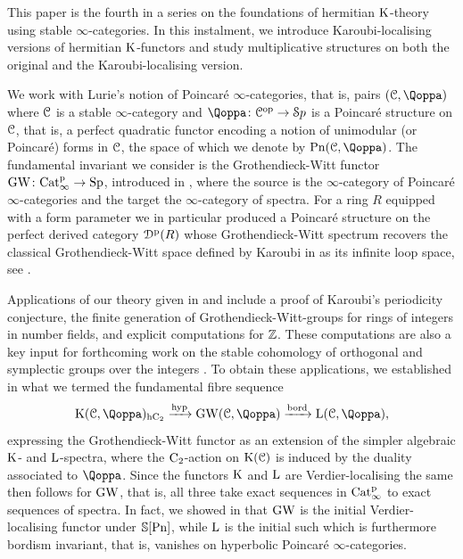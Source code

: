 This paper is the fourth in a series on the foundations of hermitian $\operatorname K$-theory using stable $\infty$-categories. In this instalment, we introduce Karoubi-localising versions of hermitian $\operatorname K$-functors and study multiplicative structures on both the original and the Karoubi-localising version.

We work with Lurie's notion of Poincaré $\infty$-categories, that is, pairs $(\C,\QF)$ where $\mathcal C$ is a stable $\infty$-category and $\QF\colon \C\op \to \Spa$ is a Poincaré structure on $\mathcal C$, that is, 
a perfect quadratic functor encoding a notion of unimodular (or Poincaré) forms in $\mathcal C$, the space of which we denote by $\Poinc(\C,\QF)$.
The fundamental invariant we consider is %
the Grothendieck-Witt functor $\operatorname{GW}\colon \mathrm{Cat}^{\mathrm p}_\infty \to \mathrm{Sp}$, introduced in \papertwo, where the source is the $\infty$-category of Poincaré $\infty$-categories and the target the $\infty$-category of spectra.
For a ring $R$ equipped with a form parameter we in particular produced a Poincar\'e structure on the perfect derived category ${\mathcal D}^{\mathrm{p}}(R)$ whose Grothendieck-Witt spectrum recovers the classical Grothendieck-Witt space defined by Karoubi in \cites{karoubi-quillen,Karoubi-Le-theoreme-fondamental} as its infinite loop space, see \cite{comparison}. 

Applications of our theory given in \papertwo and \paperthree include a proof of Karoubi's periodicity conjecture, the finite generation of Grothendieck-Witt-groups for rings of integers in number fields, and explicit computations for $\mathbb{Z}$.
These computations are also a key input for forthcoming work on the stable cohomology of orthogonal and symplectic groups over the integers \cite{HLN-cohomology2,HLN-cohomologyp}. 
To obtain these applications,
we established in \papertwo what we termed the fundamental fibre sequence
\[
\K(\C,\QF)_\hC \xrightarrow{\hyp} \GW(\C,\QF) \xrightarrow{\bord} \L(\C,\QF),
\]
expressing the Grothendieck-Witt functor as an extension of the simpler algebraic $\operatorname K$- and $\operatorname L$-spectra, where the $\mathrm{C_2}$-action on $\operatorname K(\mathcal C)$ is induced by the duality associated to $\QF$. Since the functors $\operatorname K$ and $\operatorname L$ are Verdier-localising the same then follows for $\operatorname{GW}$, that is, all three take exact sequences in $\mathrm{Cat}^{\mathrm p}_\infty$ %
to exact sequences of spectra. In fact, we showed in \papertwo that $\operatorname{GW}$ is the initial Verdier-localising functor under 
$\mathbb{S}[\mathrm{Pn}]$, %
while $\operatorname L$ is the initial such which is furthermore bordism invariant, that is, vanishes on hyperbolic Poincaré $\infty$-categories.\\


